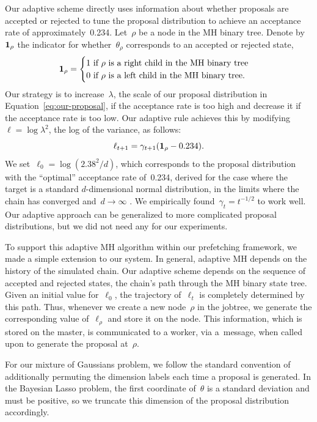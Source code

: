 \documentclass[angelino.tex]{subfiles}
\begin{document}
Our adaptive scheme directly uses information about whether proposals are
accepted or rejected to tune the proposal distribution to achieve an
acceptance rate of approximately~0.234.
Let~$\rho$ be a node in the MH binary tree.
Denote by~$\mathbf{1}_\rho$ the indicator for whether~$\theta_\rho$ corresponds to
an accepted or rejected state, \ie
\[
\mathbf{1}_\rho = \begin{cases}
1 \text{ if } \rho \text{ is a right child in the MH binary tree} \\
0 \text{ if } \rho \text{ is a left child in the MH binary tree}.
\end{cases}
\]
Our strategy is to increase~$\lambda$, the scale of our proposal distribution in 
Equation~\ref{eq:our-proposal}, if the acceptance rate is too high
and decrease it if the acceptance rate is too low.
Our adaptive rule achieves this by modifying~${\ell = \log{\lambda^2}}$,
the log of the variance, as follows:
\[
\ell_{t+1} = \gamma_{t+1} (\mathbf{1}_\rho - 0.234).
\]
We set~${\ell_0 = \log(2.38^2 / d)}$, which corresponds to the proposal
distribution with the ``optimal'' acceptance rate of~0.234, derived
for the case where the target is a standard {$d$-dimensional} normal distribution,
in the limits where the chain has converged
and~${d \rightarrow \infty}$ \citep{roberts-1997-accept}.
We empirically found~${\gamma_t = t^{-1/2}}$ to work well.
Our adaptive approach can be generalized to more complicated proposal
distributions, but we did not need any for our experiments.

To support this adaptive MH algorithm within our prefetching framework,
we made a simple extension to our system.
In general, adaptive MH depends on the history of the simulated chain.
Our adaptive scheme depends on the sequence of accepted and rejected states,
\ie the chain's path through the MH binary state tree.
Given an initial value for~$\ell_0$, the trajectory of~$\ell_t$
is completely determined by this path.
Thus, whenever we create a new node~$\rho$ in the jobtree,
we generate the corresponding value of~$\ell_\rho$ and store it on the node.
This information, which is stored on the master, is communicated to a worker,
via a~\HAVEWORK message, when called upon to generate the proposal at~$\rho$.

For our mixture of Gaussians problem, we follow the standard convention of
additionally permuting the dimension labels each time a proposal is generated.
In the Bayesian Lasso problem, the first coordinate of~$\theta$ is a standard
deviation and must be positive, so we truncate this dimension of the proposal
distribution accordingly.
\end{document}
